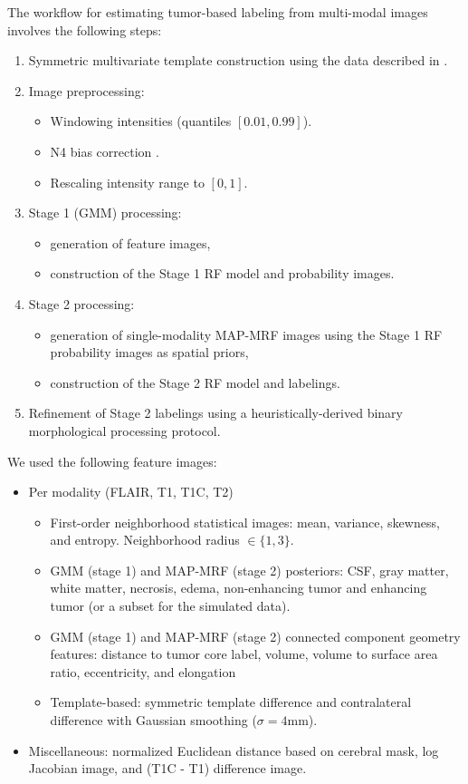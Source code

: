 The workflow for estimating tumor-based labeling from multi-modal 
images involves the following steps:
\begin{enumerate}
  \item Symmetric multivariate template construction \cite{avants2010}
 using the data described in \cite{landman2011}.
  \item Image preprocessing:
    \begin{itemize}
      \item Windowing intensities (quantiles $[0.01,0.99]$).
      \item N4 bias correction \cite{tustison2010}.
      \item Rescaling intensity range to $[0,1]$.  
    \end{itemize}
  \item Stage 1 (GMM) processing:
  \begin{itemize}
    \item generation of feature images,
    \item construction of the Stage 1 RF model and probability images.
  \end{itemize}
  \item Stage 2 processing:
  \begin{itemize}
    \item generation of single-modality MAP-MRF images using the Stage 1 RF probability images as spatial priors,
    \item construction of the Stage 2 RF model and labelings.
  \end{itemize}
  \item Refinement of Stage 2 labelings using a heuristically-derived binary morphological processing protocol.
\end{enumerate}

We used the following feature images:
\begin{itemize}
  \item Per modality (FLAIR, T1, T1C, T2)
    \begin{itemize}
      \item First-order neighborhood statistical images:
            mean, variance, skewness, and entropy. 
            Neighborhood radius $\in \{1,3\}$.
    \item GMM (stage 1) and MAP-MRF (stage 2) posteriors: CSF, gray matter, white 
          matter, necrosis, edema, non-enhancing tumor and enhancing tumor (or a
          subset for the simulated data).
    \item GMM (stage 1) and MAP-MRF (stage 2) connected component geometry 
          features:  distance to tumor core label, volume, volume to surface area ratio, eccentricity, and elongation
    \item Template-based:  symmetric template difference and 
          contralateral difference with Gaussian smoothing ($\sigma = 4$mm).
    \end{itemize}
  \item Miscellaneous: normalized Euclidean distance based on cerebral mask,
    log Jacobian image, and  (T1C - T1) difference image.
\end{itemize}

